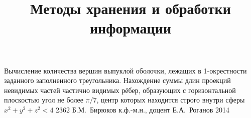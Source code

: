 \documentclass[a4paper,12pt]{memoir}
\begin{document}
\renewcommand{\contentsname}{{\Large{Содержание}\hfill}}

\title{Методы хранения и обработки информации}
{Вычисление количества вершин выпуклой оболочки, лежащих в 1-окрестности
 заданного заполненного треугольника.
 Нахождение суммы длин проекций невидимых частей частично видимых рёбер,
  образующих с горизонтальной плоскостью угол не более $\pi/7$, центр 
  которых находится строго внутри сферы $x^2+y^2+z^2<4$}
{2362}
{Б.\+М.~Бирюков}
{к.ф.-м.н., доцент}
{Е.\+А.~Роганов}
{2014}





\end{document}
